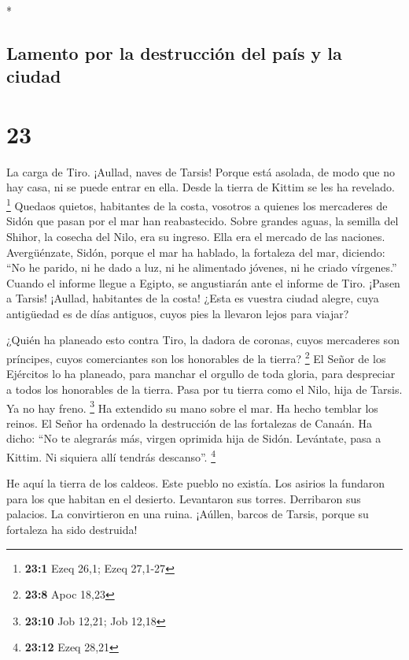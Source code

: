 \begin{paracol}{2}
\switchcolumn[0]*

\hypertarget{lamento-por-la-destrucciuxf3n-del-pauxeds-y-la-ciudad}{%
\subsection{Lamento por la destrucción del país y la
ciudad}\label{lamento-por-la-destrucciuxf3n-del-pauxeds-y-la-ciudad}}

\hypertarget{section-44}{%
\section{23}\label{section-44}}

 La carga de Tiro. ¡Aullad, naves de Tarsis! Porque está
asolada, de modo que no hay casa, ni se puede entrar en ella. Desde la
tierra de Kittim se les ha revelado. \footnote{\textbf{23:1} Ezeq 26,1;
  Ezeq 27,1-27}  Quedaos quietos, habitantes de la costa,
vosotros a quienes los mercaderes de Sidón que pasan por el mar han
reabastecido.  Sobre grandes aguas, la semilla del Shihor,
la cosecha del Nilo, era su ingreso. Ella era el mercado de las
naciones.  Avergüénzate, Sidón, porque el mar ha hablado,
la fortaleza del mar, diciendo: ``No he parido, ni he dado a luz, ni he
alimentado jóvenes, ni he criado vírgenes.''  Cuando el
informe llegue a Egipto, se angustiarán ante el informe de Tiro.
 ¡Pasen a Tarsis! ¡Aullad, habitantes de la costa!
 ¿Esta es vuestra ciudad alegre, cuya antigüedad es de
días antiguos, cuyos pies la llevaron lejos para viajar?

 ¿Quién ha planeado esto contra Tiro, la dadora de
coronas, cuyos mercaderes son príncipes, cuyos comerciantes son los
honorables de la tierra? \footnote{\textbf{23:8} Apoc 18,23}
 El Señor de los Ejércitos lo ha planeado, para manchar el
orgullo de toda gloria, para despreciar a todos los honorables de la
tierra.  Pasa por tu tierra como el Nilo, hija de Tarsis.
Ya no hay freno. \footnote{\textbf{23:10} Job 12,21; Job 12,18}
 Ha extendido su mano sobre el mar. Ha hecho temblar los
reinos. El Señor ha ordenado la destrucción de las fortalezas de Canaán.
 Ha dicho: ``No te alegrarás más, virgen oprimida hija de
Sidón. Levántate, pasa a Kittim. Ni siquiera allí tendrás descanso''.
\footnote{\textbf{23:12} Ezeq 28,21}

 He aquí la tierra de los caldeos. Este pueblo no
existía. Los asirios la fundaron para los que habitan en el desierto.
Levantaron sus torres. Derribaron sus palacios. La convirtieron en una
ruina.  ¡Aúllen, barcos de Tarsis, porque su fortaleza ha
sido destruida!


\end{paracol}
